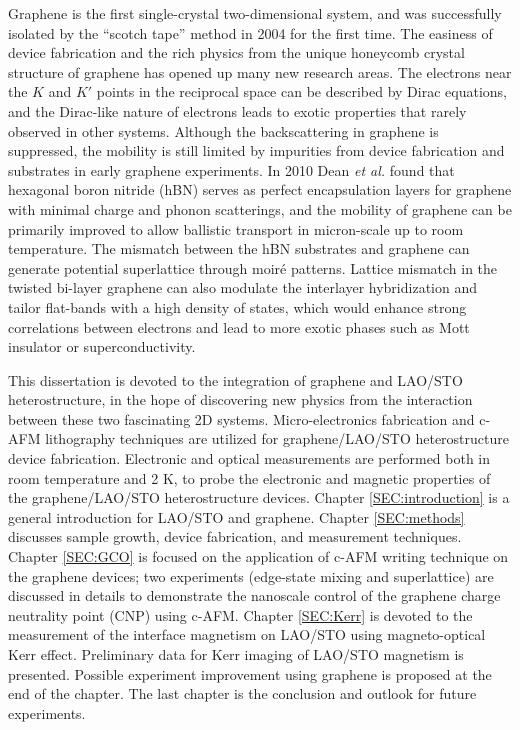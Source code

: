 \documentclass[pdflatex, sectionletters, 12pt]{pittetd}    %
\begin{document}
Graphene is the first single-crystal two-dimensional system, and was successfully isolated by the ``scotch tape'' method in 2004\cite{novoselov2004electric} for the first time. The easiness of device fabrication and the rich physics from the unique honeycomb crystal structure of graphene has opened up many new research areas. The electrons near the $K$ and $K'$ points in the reciprocal space can be described by Dirac equations\cite{wallace1947band, neto2009electronic}, and the Dirac-like nature of electrons\cite{novoselov2004electric, zhang2005experimental} leads to exotic properties that rarely observed in other systems. Although the backscattering in graphene is suppressed\cite{ando1998berry}, the mobility is still limited by impurities from device fabrication and substrates in early graphene experiments. In 2010 Dean \textit{et al.} found that hexagonal boron nitride (hBN) serves as perfect encapsulation layers for graphene with minimal charge and phonon scatterings\cite{dean2010naturenano}, and the mobility of graphene can be primarily improved to allow ballistic transport in micron-scale up to room temperature\cite{mayorov2011micrometer}. The mismatch between the hBN substrates and graphene can generate potential superlattice through moir{\'e} patterns. Lattice mismatch in the twisted bi-layer graphene can also modulate the interlayer hybridization and tailor flat-bands with a high density of states, which would enhance strong correlations between electrons and lead to more exotic phases such as Mott insulator\cite{cao2016superlattice, cao2018correlated, chen2018gate} or superconductivity\cite{cao2018unconventional}.

This dissertation is devoted to the integration of graphene and LAO/STO heterostructure, in the hope of discovering new physics from the interaction between these two fascinating 2D systems. Micro-electronics fabrication and c-AFM lithography techniques are utilized for graphene/LAO/STO heterostructure device fabrication. Electronic and optical measurements are performed both in room temperature and 2 K, to probe the electronic and magnetic properties of the graphene/LAO/STO heterostructure devices. Chapter \ref{SEC:introduction} is a general introduction for LAO/STO and graphene. Chapter \ref{SEC:methods} discusses sample growth, device fabrication, and measurement techniques. Chapter \ref{SEC:GCO} is focused on the application of c-AFM writing technique on the graphene devices; two experiments (edge-state mixing and superlattice) are discussed in details to demonstrate the nanoscale control of the graphene charge neutrality point (CNP) using c-AFM. Chapter \ref{SEC:Kerr} is devoted to the measurement of the interface magnetism on LAO/STO using magneto-optical Kerr effect. Preliminary data for Kerr imaging of LAO/STO magnetism is presented. Possible experiment improvement using graphene is proposed at the end of the chapter. The last chapter is the conclusion and outlook for future experiments.
\end{document}
